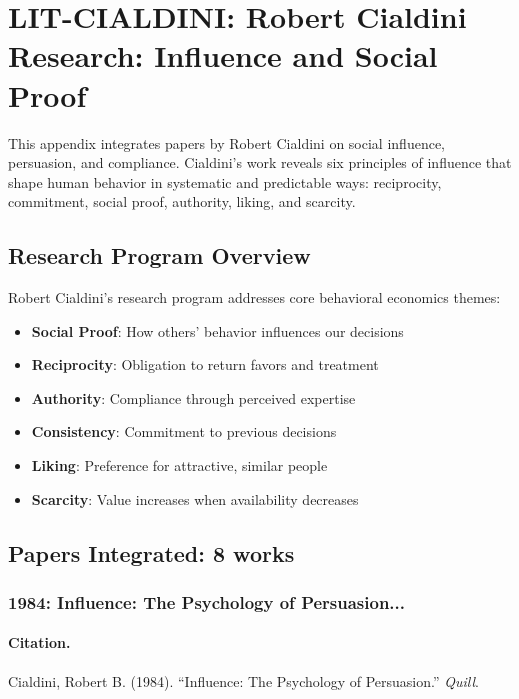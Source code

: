 \section{LIT-CIALDINI: Robert Cialdini Research: Influence and Social Proof}
\label{app:lity}

This appendix integrates papers by Robert Cialdini on social influence,
persuasion, and compliance. Cialdini's work reveals six principles of influence that shape
human behavior in systematic and predictable ways: reciprocity, commitment, social proof,
authority, liking, and scarcity.

\subsection{Research Program Overview}

Robert Cialdini's research program addresses core behavioral economics themes:

\begin{itemize}
  \item \textbf{Social Proof}: How others' behavior influences our decisions
  \item \textbf{Reciprocity}: Obligation to return favors and treatment
  \item \textbf{Authority}: Compliance through perceived expertise
  \item \textbf{Consistency}: Commitment to previous decisions
  \item \textbf{Liking}: Preference for attractive, similar people
  \item \textbf{Scarcity}: Value increases when availability decreases
\end{itemize}

\subsection{Papers Integrated: 8 works}

\subsubsection{1984: Influence: The Psychology of Persuasion...}

\paragraph{Citation.}
Cialdini, Robert B. (1984). ``Influence: The Psychology of Persuasion.''
\textit{Quill}.

